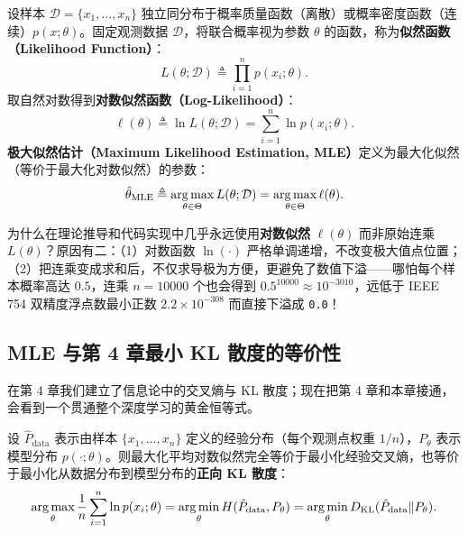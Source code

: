 \begin{defBox}
\begin{definition}
\label{def:ch5-mle}
设样本 $\mathcal{D} = \{x_1, \dots, x_n\}$ 独立同分布于概率质量函数（离散）或概率密度函数（连续）$p(x; \theta)$。固定观测数据 $\mathcal{D}$，将联合概率视为参数 $\theta$ 的函数，称为\textbf{似然函数（Likelihood Function）}：
\[
  L(\theta; \mathcal{D}) \triangleq \prod_{i=1}^n p(x_i; \theta).
\]
取自然对数得到\textbf{对数似然函数（Log-Likelihood）}：
\begin{equation}
  \ell(\theta) \triangleq \ln L(\theta; \mathcal{D}) = \sum_{i=1}^n \ln p(x_i; \theta).
  \label{eq:ch5-loglik}
\end{equation}
\textbf{极大似然估计（Maximum Likelihood Estimation, MLE）}定义为最大化似然（等价于最大化对数似然）的参数：
\[
  \hat{\theta}_{\text{MLE}} \triangleq \operatorname*{arg\,max}_{\theta \in \Theta} L(\theta; \mathcal{D}) = \operatorname*{arg\,max}_{\theta \in \Theta} \ell(\theta).
\]
\end{definition}
\end{defBox}

为什么在理论推导和代码实现中几乎永远使用\textbf{对数似然} $\ell(\theta)$ 而非原始连乘 $L(\theta)$？原因有二：（1）对数函数 $\ln(\cdot)$ 严格单调递增，不改变极大值点位置；（2）把连乘变成求和后，不仅求导极为方便，更避免了数值下溢——哪怕每个样本概率高达 $0.5$，连乘 $n=10000$ 个也会得到 $0.5^{10000} \approx 10^{-3010}$，远低于 IEEE 754 双精度浮点数最小正数 $2.2\times 10^{-308}$ 而直接下溢成 \texttt{0.0}！

\subsection{MLE 与第 4 章最小 KL 散度的等价性}
\label{subsec:ch5-mle-kl}

在第 4 章我们建立了信息论中的交叉熵与 KL 散度；现在把第 4 章和本章接通，会看到一个贯通整个深度学习的黄金恒等式。

\begin{thmBox}
\begin{proposition}
\label{prop:ch5-mle-kl}
设 $\hat{P}_{\text{data}}$ 表示由样本 $\{x_1, \dots, x_n\}$ 定义的经验分布（每个观测点权重 $1/n$），$P_\theta$ 表示模型分布 $p(\cdot; \theta)$。则最大化平均对数似然完全等价于最小化经验交叉熵，也等价于最小化从数据分布到模型分布的\textbf{正向 KL 散度}：
\begin{equation}
  \operatorname*{arg\,max}_\theta \frac{1}{n}\sum_{i=1}^n \ln p(x_i; \theta)
  = \operatorname*{arg\,min}_\theta H(\hat{P}_{\text{data}}, P_\theta)
  = \operatorname*{arg\,min}_\theta D_{\mathrm{KL}}(\hat{P}_{\text{data}} \| P_\theta).
  \label{eq:ch5-mle-kl}
\end{equation}
\end{proposition}
\end{thmBox}

